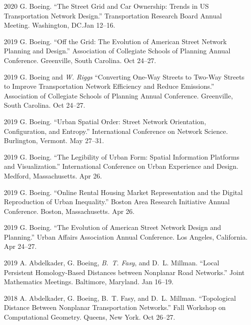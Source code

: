 \documentclass[11pt,letterpaper]{report}
\begin{document}
\begin{tablist}
        \item[2020] \tab{}G. Boeing. \enquote{The Street Grid and Car Ownership: Trends in US Transportation Network Design.} Transportation Research Board Annual Meeting. Washington, DC.\@ Jan 12--16.

        \item[2019] \tab{}G. Boeing. \enquote{Off the Grid: The Evolution of American Street Network Planning and Design.} Association of Collegiate Schools of Planning Annual Conference. Greenville, South Carolina. Oct 24--27.

        \item[2019] \tab{}G. Boeing and \textit{W. Riggs} \enquote{Converting One-Way Streets to Two-Way Streets to Improve Transportation Network Efficiency and Reduce Emissions.} Association of Collegiate Schools of Planning Annual Conference. Greenville, South Carolina. Oct 24--27.

        \item[2019] \tab{}G. Boeing. \enquote{Urban Spatial Order: Street Network Orientation, Configuration, and Entropy.} International Conference on Network Science. Burlington, Vermont. May 27--31.

        \item[2019] \tab{}G. Boeing. \enquote{The Legibility of Urban Form: Spatial Information Platforms and Visualization.} International Conference on Urban Experience and Design. Medford, Massachusetts. Apr 26.

        \item[2019] \tab{}G. Boeing. \enquote{Online Rental Housing Market Representation and the Digital Reproduction of Urban Inequality.} Boston Area Research Initiative Annual Conference. Boston, Massachusetts. Apr 26.

        \item[2019] \tab{}G. Boeing. \enquote{The Evolution of American Street Network Design and Planning.} Urban Affairs Association Annual Conference. Los Angeles, California. Apr 24--27.

        \item[2019] \tab{}A. Abdelkader, G. Boeing, \textit{B.~T. Fasy}, and D.~L. Millman. \enquote{Local Persistent Homology-Based Distances between Nonplanar Road Networks.} Joint Mathematics Meetings. Baltimore, Maryland. Jan 16--19.

        \item[2018] \tab{}A. Abdelkader, G. Boeing, B.~T. Fasy, and D.~L. Millman. \enquote{Topological Distance Between Nonplanar Transportation Networks.} Fall Workshop on Computational Geometry. Queens, New York. Oct 26--27.


\end{tablist}
\end{document}
